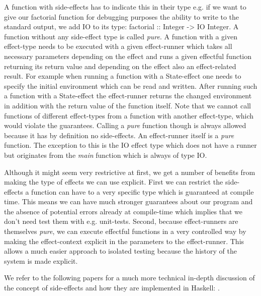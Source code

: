 A function with side-effects has to indicate this in their type e.g. if we want to give our factorial function for debugging purposes the ability to write to the standard output, we add IO to its type: factorial :: Integer -> IO Integer. A function without any side-effect type is called \textit{pure}. A function with a given effect-type needs to be executed with a given effect-runner which takes all necessary parameters depending on the effect and runs a given effectful function returning its return value and depending on the effect also an effect-related result. For example when running a function with a State-effect one needs to specify the initial environment which can be read and written. After running such a function with a State-effect the effect-runner returns the changed environment in addition with the return value of the function itself. Note that we cannot call functions of different effect-types from a function with another effect-type, which would violate the guarantees. Calling a \textit{pure} function though is always allowed because it has by definition no side-effects. An effect-runner itself is a \textit{pure} function. The exception to this is the IO effect type which does not have a runner but originates from the \textit{main} function which is always of type IO.

Although it might seem very restrictive at first, we get a number of benefits from making the type of effects we can use explicit. First we can restrict the side-effects a function can have to a very specific type which is guaranteed at compile time. This means we can have much stronger guarantees about our program and the absence of potential errors already at compile-time which implies that we don't need test them with e.g. unit-tests. Second, because effect-runners are themselves \textit{pure}, we can execute effectful functions in a very controlled way by making the effect-context explicit in the parameters to the effect-runner. This allows a much easier approach to isolated testing because the history of the system is made explicit.

We refer to the following papers for a much more technical in-depth discussion of the concept of side-effects and how they are implemented in Haskell: \citep{moggi_computational_1989, wadler_essence_1992, wadler_monads_1995, wadler_how_1997, jones_tackling_2002}.

